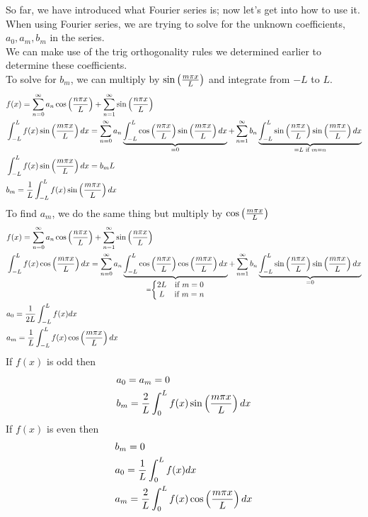 \documentclass[11pt, fleqn]{article}
\begin{document}
So far, we have introduced what Fourier series is; now let's get into how to use it.\\
When using Fourier series, we are trying to solve for the unknown coefficients, $a_0,a_m,b_m$ in the series.\\
We can make use of the trig orthogonality rules we determined earlier to determine these coefficients.\\
To solve for $b_m$, we can multiply by $\sin\left( \frac{m\pi x}{L} \right)$ and integrate from $-L$ to $L$.
\begin{align*}
    &f(x)=\sum_{n=0}^\infty a_n\cos\left( \frac{n\pi x}{L} \right)+\sum_{n=1}^\infty\sin\left( \frac{n\pi x}{L} \right)\\
    &\int_{-L}^L f(x)\sin\left( \frac{m\pi x}{L} \right)dx=\sum_{n=0}^\infty a_n\underbrace{\int_{-L}^L\cos\left( \frac{n\pi x}{L} \right)\sin\left( \frac{m\pi x}{L} \right)dx}_{=0}+\sum_{n=1}^\infty b_n\underbrace{\int_{-L}^L\sin\left( \frac{n\pi x}{L} \right)\sin\left( \frac{m\pi x}{L} \right)dx}_{=L\text{ if }m=n}\\
    &\int_{-L}^Lf(x)\sin\left( \frac{m\pi x}{L} \right)dx=b_mL\\
    &b_m=\frac{1}{L}\int_{-L}^L f(x)\sin\left( \frac{m\pi x}{L} \right)dx
\end{align*}
To find $a_m$, we do the same thing but multiply by $\cos\left( \frac{m\pi x}{L} \right)$
\begin{align*}
    &f(x)=\sum_{n=0}^\infty a_n\cos\left( \frac{n\pi x}{L} \right)+\sum_{n=1}^\infty\sin\left( \frac{n\pi x}{L} \right)\\
    &\int_{-L}^Lf(x)\cos\left( \frac{m\pi x}{L} \right)dx=\sum_{n=0}^\infty a_n\underbrace{\int_{-L}^L\cos\left( \frac{n\pi x}{L} \right)\cos\left( \frac{m\pi x}{L} \right)dx}_{=\left\{\begin{matrix} 2L & \text{if }m=0\\ L & \text{if }m=n \end{matrix}\right.}+\sum_{n=1}^\infty b_n\underbrace{\int_{-L}^L\sin\left( \frac{n\pi x}{L} \right)\sin\left( \frac{m\pi x}{L} \right)dx}_{=0}\\
    &a_0=\frac{1}{2L}\int_{-L}^L f(x)dx\\
    &a_m=\frac{1}{L}\int_{-L}^L f(x)\cos\left( \frac{m\pi x}{L} \right)dx
\end{align*}
If $f(x)$ is odd then
\begin{align*}
    &a_0=a_m=0\\
    &b_m=\frac{2}{L}\int_0^L f(x)\sin\left( \frac{m\pi x}{L} \right)dx
\end{align*}
If $f(x)$ is even then
\begin{align*}
    &b_m=0\\
    &a_0=\frac{1}{L}\int_0^L f(x)dx\\
    &a_m=\frac{2}{L}\int_0^L f(x)\cos\left( \frac{m\pi x}{L} \right)dx
\end{align*}
\end{document}

